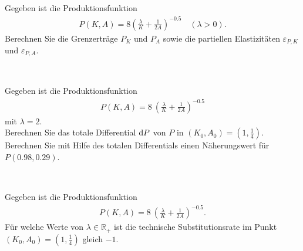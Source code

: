 \subsection*{}
Gegeben ist die Produktionsfunktion
\begin{align*}
P(K,A)= 
8  \left( \frac{\lambda}{K} +\frac{1}{2A} \right)^{-0.5}
\quad ( \lambda >0 ).
\end{align*}
Berechnen Sie die Grenzerträge $P_K$ und $P_A$
sowie die partiellen Elastizitäten 
$\varepsilon_{P,K}$ und $\varepsilon_{P,A}$.
\ \\
\\
\subsection*{}
Gegeben ist die Produktionsfunktion
\begin{align*}
P(K,A)= 
8 \ \left( \frac{\lambda}{K} +\frac{1}{2A} \right)^{-0.5}
\end{align*}
mit $\lambda = 2$.\\
Berechnen Sie das totale Differential $\text{\rmfamily d} P$ von $P$
in $(K_0,A_0)= \left( 1, \frac{1}{4} \right)$.\\
Berechnen Sie mit Hilfe des totalen Differentials einen Näherungswert für $P(0.98,0.29)$.
\ \\
\\
\subsection*{}
Gegeben ist die Produktionsfunktion
\begin{align*}
P(K,A)= 
8 \ \left( \frac{\lambda}{K} +\frac{1}{2A} \right)^{-0.5}.
\end{align*}
Für welche Werte von $\lambda \in \mathbb{R}_+$ ist die technische Substitutionsrate im Punkt $(K_0,A_0) = \left( 1, \frac{1}{4} \right)$ gleich $-1$.
\newpage



